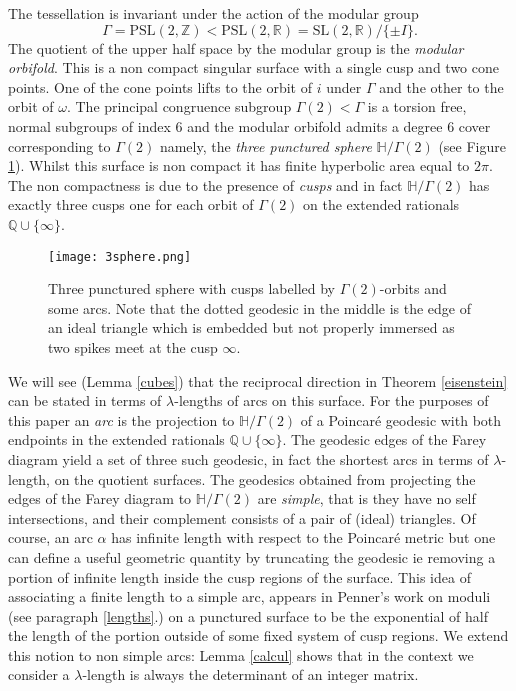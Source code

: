 \documentclass[12pt]{amsart}
\theoremstyle{plain}
\theoremstyle{definition}
\def\HH{\mathbb{H}}
\def\xx{\HH/g2}
\def\ZZ{\mathbb{Z}}
\def\RR{\mathbb{R}}
\def\QQ{\mathbb{Q}}
\def\sl2{\mathrm{PSL}(2, \ZZ)}
\def\slr{\mathrm{PSL}(2, \RR)}
\def\g2{\Gamma(2)}
\def\xx{\HH/\g2}
\begin{document}
The tessellation is invariant under the action of the modular group
$$\Gamma = \sl2< \slr = \mathrm{SL}(2, \RR)/\{ \pm I\}.$$
The quotient  of the upper half space by the modular group 
is the \textit{modular orbifold}. This is a non compact singular
surface with a single cusp and two cone points. 
One of the cone points lifts to the orbit of $i$  under $\Gamma$ 
and the other to the orbit of $\omega$.
The principal congruence subgroup $\g2<\Gamma$
 is a torsion free, normal subgroups of index 6
and the modular orbifold admits a degree 6 cover
corresponding to $\g2$
namely, the \textit{three punctured sphere} $\HH/\g2$ (see Figure \ref{3punctured}).
Whilst this surface is non compact it has finite hyperbolic area
equal to $2\pi$. The non compactness is due to the presence of
\textit{cusps} and in fact  $\HH/\g2$ has exactly three cusps one for each orbit of $\g2$ on the extended rationals $\QQ \cup \{ \infty \}$.


\begin{figure}[ht]
\begin{center}
\texttt{[image: 3sphere.png]} 
% 
\end{center}
\caption{Three punctured sphere with cusps labelled by $\Gamma(2)$-orbits
and some arcs.
Note that the dotted geodesic in the middle is the edge 
of an ideal triangle which is embedded but not properly immersed
as two spikes meet at the cusp $\infty$.}
 \label{3punctured}
\end{figure}

We will see (Lemma \ref{cubes}) that the reciprocal direction in 
Theorem \ref{eisenstein} can be stated in terms  of  $\lambda$-lengths
 of arcs on  this surface.
 For the purposes of this paper
 an \textit{arc}  
 is the projection to $\xx$ of a 
 Poincar\'e geodesic with both  endpoints in the 
 extended rationals $\QQ \cup \{ \infty\}$.
The geodesic edges of the Farey diagram yield a set of three such geodesic, 
 in fact the shortest arcs
 in terms of $\lambda$-length,  on the quotient surfaces.
The geodesics obtained from projecting the edges of the Farey
diagram to $\xx$
are \textit{simple}, that is they have no self intersections, 
and their complement consists of a pair of (ideal) triangles.
Of course, an arc $\alpha$ has infinite length with respect to the Poincar\'e metric  but one can define a useful geometric quantity   by truncating the geodesic ie removing a portion of infinite length  inside the cusp regions of the surface.
This idea of associating a finite length to a simple arc,
appears in Penner's work on moduli \cite{bob}
 (see paragraph \ref{lengths}.) 
on a punctured
surface to be the exponential of half the 
length of the portion outside of some fixed
system of cusp regions.
We extend this notion to non simple arcs:
Lemma \ref{calcul} shows that in the context we consider
a $\lambda$-length is always the determinant 
of an integer matrix.
\end{document}
